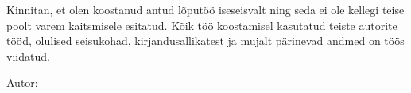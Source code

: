Kinnitan, et olen koostanud antud lõputöö iseseisvalt ning seda ei ole kellegi teise poolt
varem kaitsmisele esitatud. Kõik töö koostamisel kasutatud teiste autorite tööd, olulised
seisukohad, kirjandusallikatest ja mujalt pärinevad andmed on töös viidatud.

\begin{flushleft}

Autor:~\authorName\\
\vspace*{0.5cm}
\signatureDate
 
\end{flushleft}